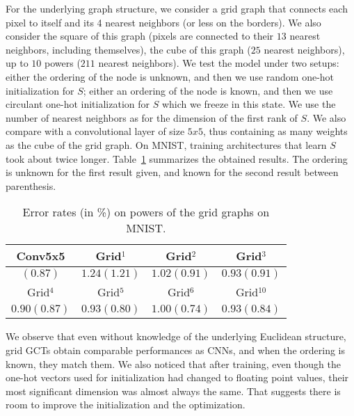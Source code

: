 For the underlying graph structure, we consider a grid graph that connects each pixel to itself and its 4 nearest neighbors (or less on the borders). We also consider the square of this graph (pixels are connected to their $13$ nearest neighbors, including themselves), the cube of this graph ($25$ nearest neighbors), up to $10$ powers ($211$ nearest neighbors).
We test the model under two setups: either the ordering of the node is unknown, and then we use random one-hot initialization for $S$; either an ordering of the node is known, and then we use circulant one-hot initialization for $S$ which we freeze in this state. We use the number of nearest neighbors as for the dimension of the first rank of $S$.
We also compare with a convolutional layer of size $5x5$, thus containing as many weights as the cube of the grid graph. On MNIST, training architectures that learn $S$ took about twice longer. Table~\ref{toy} summarizes the obtained results. The ordering is unknown for the first result given, and known for the second result between parenthesis.

\begin{table}[H]
  \caption{Error rates (in \%) on powers of the grid graphs on MNIST.}
  \begin{center}
    \bgroup
    \def\arraystretch{1.5}%
    \begin{tabular}{|c|c|c|c|}
      \hline
      Conv5x5 & Grid$^1$ & Grid$^2$ & Grid$^3$\\
      \hline
      $(0.87)$ & $1.24 (1.21)$ & $1.02 (0.91)$ & $0.93 (0.91)$\\
      \hline
      \hline
      Grid$^4$ & Grid$^5$ & Grid$^6$ & Grid$^{10}$\\
      \hline
      $0.90 (0.87)$ & $0.93 (0.80)$ & $1.00 (0.74)$ & $0.93 (0.84)$\\
      \hline
    \end{tabular}
    \egroup
  \end{center}
  \label{toy}
\end{table}

We observe that even without knowledge of the underlying Euclidean structure, grid GCTs obtain comparable performances as CNNs, and when the ordering is known, they match them. We also noticed that after training, even though the one-hot vectors used for initialization had changed to floating point values, their most significant dimension was almost always the same. That suggests there is room to improve the initialization and the optimization.

